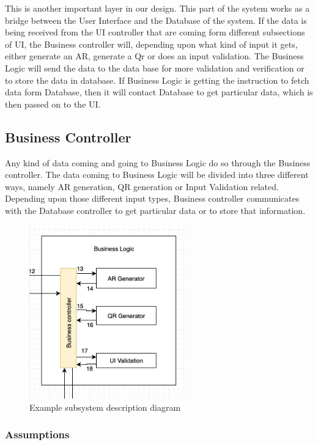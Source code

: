 
This is another important layer in our design. This part of the system works as a bridge between the User Interface and the Database of the system. If the data is being received from the UI controller that are coming form different subsections of UI, the Business controller will, depending upon what kind of input it gets, either generate an AR, generate a Qr or does an input validation. The Business Logic will send the data to the data base for more validation and verification or to store the data in database. If Business Logic is getting the instruction to fetch data form Database, then it will contact Database to get particular data, which is then passed on to the UI.

\subsection{Business Controller}
Any kind of data coming and going to Business Logic do so through the Business controller. The data coming to Business Logic will be divided into three different ways, namely AR generation, QR generation or Input Validation related. Depending upon those different input types, Business controller communicates with the Database controller to get particular data or to store that information.

\begin{figure}[h!]
	\centering
 	\includegraphics[width=0.60\textwidth]{images/businesscontroller}
 \caption{Example subsystem description diagram}
\end{figure}

\subsubsection{Assumptions}

